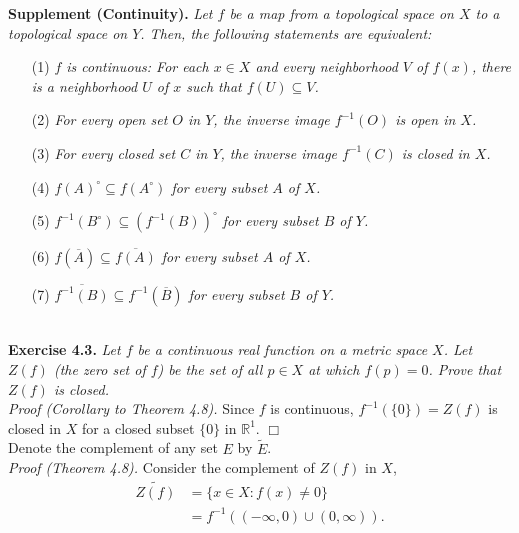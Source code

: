 \documentclass{article}
\begin{document}
\textbf{Supplement (Continuity).}
\emph{Let $f$ be a map from a topological space on $X$
to a topological space on $Y$.
Then, the following statements are equivalent:}
\begin{enumerate}
\item[(1)]
\emph{$f$ is continuous:
For each $x \in X$ and every neighborhood $V$ of $f(x)$,
there is a neighborhood $U$ of $x$ such that $f(U) \subseteq V$.}
\item[(2)]
\emph{For every open set $O$ in $Y$, the inverse image $f^{-1}(O)$
is open in $X$.}
\item[(3)]
\emph{For every closed set $C$ in $Y$, the inverse image $f^{-1}(C)$
is closed in $X$.}
\item[(4)]
\emph{$f(A)^{\circ} \subseteq f(A^{\circ})$ for every subset $A$ of $X$.}
\item[(5)]
\emph{$f^{-1}(B^{\circ}) \subseteq (f^{-1}(B))^{\circ}$ for every subset $B$ of $Y$.}
\item[(6)]
\emph{$f(\overline{A}) \subseteq \overline{f(A)}$ for every subset $A$ of $X$.}
\item[(7)]
\emph{$\overline{f^{-1}(B)} \subseteq f^{-1}(\overline{B})$ for every subset $B$ of $Y$.} \\\\
\end{enumerate}






\textbf{Exercise 4.3.}
\emph{Let $f$ be a continuous real function on a metric space $X$.
Let $Z(f)$ (the zero set of $f$) be the set of all $p \in X$ at which $f(p) = 0$.
Prove that $Z(f)$ is closed.} \\

\emph{Proof (Corollary to Theorem 4.8).}
Since $f$ is continuous, $f^{-1}(\{0\}) = Z(f)$ is closed in $X$
for a closed subset $\{0\}$ in $\mathbb{R}^1$.
$\Box$ \\

Denote the complement of any set $E$ by $\widetilde{E}$. \\

\emph{Proof (Theorem 4.8).}
Consider the complement of $Z(f)$ in $X$,
\begin{align*}
\widetilde{Z(f)}
&= \{ x \in X : f(x) \neq 0 \} \\
&= f^{-1}((-\infty, 0) \cup (0, \infty)).
\end{align*}
\end{document}
